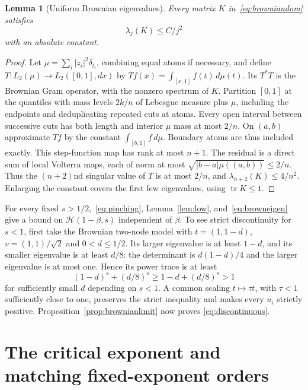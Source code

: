 \documentclass[11pt]{article}
\newtheorem{lemma}[theorem]{Lemma}
\numberwithin{equation}{section}
\newcommand{\tr}{\operatorname{tr}}
\newcommand{\cH}{\mathcal H}
\begin{document}
\begin{lemma}[Uniform Brownian eigenvalues]\label{lem:browneigen}
Every matrix $K$ in~\eqref{eq:browniandom} satisfies
\begin{equation}\label{eq:browneigen}
 \lambda_j(K)\le C/j^2
\end{equation}
with an absolute constant.
\end{lemma}
\begin{proof}
Let $\mu=\sum_i|z_i|^2\delta_{t_i}$, combining equal atoms if
necessary, and define $T:L_2(\mu)\to L_2([0,1],dx)$ by
$Tf(x)=\int_{[x,1]}f(t)\,d\mu(t)$. Its $T^*T$ is the Brownian
Gram operator, with the nonzero spectrum of $K$.
Partition $[0,1]$ at the quantiles with mass levels $2k/n$ of
Lebesgue measure plus $\mu$, including the endpoints and deduplicating
repeated cuts at atoms. Every open interval between successive cuts
has both length and interior $\mu$ mass at most $2/n$.
On $(a,b)$ approximate $Tf$ by the constant $\int_{[b,1]}f\,d\mu$.
Boundary atoms are thus included exactly. This step-function map has
rank at most $n+1$. The residual is a direct sum of local Volterra
maps, each of norm at most
$\sqrt{|b-a|\mu((a,b))}\le2/n$.
Thus the $(n+2)$nd singular value of $T$ is at most $2/n$, and
$\lambda_{n+2}(K)\le4/n^2$. Enlarging the constant covers the first
few eigenvalues, using $\tr K\le1$.
\end{proof}

For every fixed $s>1/2$,~\eqref{eq:pinching},
Lemma~\ref{lem:low}, and~\eqref{eq:browneigen} give a bound on
$\cH(1-\beta,s)$ independent of $\beta$.
To see strict discontinuity for $s<1$, first take the Brownian
two-node model with $t=(1,1-d)$, $v=(1,1)/\sqrt2$ and $0<d\le1/2$.
Its larger eigenvalue is at least $1-d$, and its smaller eigenvalue
is at least $d/8$: the determinant is $d(1-d)/4$ and the larger
eigenvalue is at most one. Hence its power trace is at least
\[
 (1-d)^s+(d/8)^s\ge1-d+(d/8)^s>1
\]
for sufficiently small $d$ depending on $s<1$.
A common scaling $t\mapsto\tau t$, with $\tau<1$ sufficiently
close to one, preserves the strict inequality and makes every $u_i$
strictly positive. Proposition~\ref{prop:brownianlimit} now proves
\eqref{eq:discontinuous}.

\section{The critical exponent and matching fixed-exponent orders}
\end{document}

